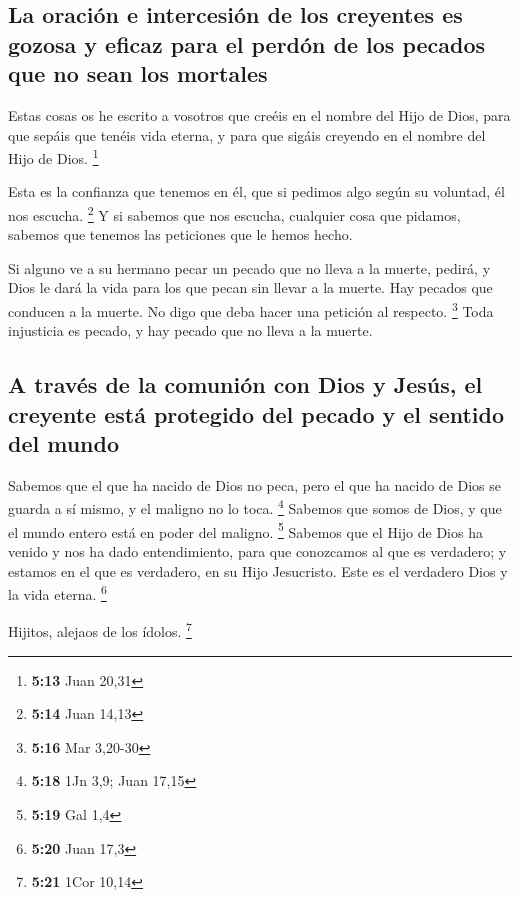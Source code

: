 \hypertarget{la-oraciuxf3n-e-intercesiuxf3n-de-los-creyentes-es-gozosa-y-eficaz-para-el-perduxf3n-de-los-pecados-que-no-sean-los-mortales}{%
\subsection{La oración e intercesión de los creyentes es gozosa y eficaz
para el perdón de los pecados que no sean los
mortales}\label{la-oraciuxf3n-e-intercesiuxf3n-de-los-creyentes-es-gozosa-y-eficaz-para-el-perduxf3n-de-los-pecados-que-no-sean-los-mortales}}

 Estas cosas os he escrito a vosotros que creéis en el
nombre del Hijo de Dios, para que sepáis que tenéis vida eterna, y para
que sigáis creyendo en el nombre del Hijo de Dios. \footnote{\textbf{5:13}
  Juan 20,31}

 Esta es la confianza que tenemos en él, que si pedimos
algo según su voluntad, él nos escucha. \footnote{\textbf{5:14} Juan
  14,13}  Y si sabemos que nos escucha, cualquier cosa
que pidamos, sabemos que tenemos las peticiones que le hemos hecho.

 Si alguno ve a su hermano pecar un pecado que no lleva a
la muerte, pedirá, y Dios le dará la vida para los que pecan sin llevar
a la muerte. Hay pecados que conducen a la muerte. No digo que deba
hacer una petición al respecto. \footnote{\textbf{5:16} Mar 3,20-30}
 Toda injusticia es pecado, y hay pecado que no lleva a
la muerte.

\hypertarget{a-travuxe9s-de-la-comuniuxf3n-con-dios-y-jesuxfas-el-creyente-estuxe1-protegido-del-pecado-y-el-sentido-del-mundo}{%
\subsection{A través de la comunión con Dios y Jesús, el creyente está
protegido del pecado y el sentido del
mundo}\label{a-travuxe9s-de-la-comuniuxf3n-con-dios-y-jesuxfas-el-creyente-estuxe1-protegido-del-pecado-y-el-sentido-del-mundo}}

 Sabemos que el que ha nacido de Dios no peca, pero el
que ha nacido de Dios se guarda a sí mismo, y el maligno no lo toca.
\footnote{\textbf{5:18} 1Jn 3,9; Juan 17,15}  Sabemos que
somos de Dios, y que el mundo entero está en poder del maligno.
\footnote{\textbf{5:19} Gal 1,4}  Sabemos que el Hijo de
Dios ha venido y nos ha dado entendimiento, para que conozcamos al que
es verdadero; y estamos en el que es verdadero, en su Hijo Jesucristo.
Este es el verdadero Dios y la vida eterna. \footnote{\textbf{5:20} Juan
  17,3}

 Hijitos, alejaos de los ídolos. \footnote{\textbf{5:21}
  1Cor 10,14}
